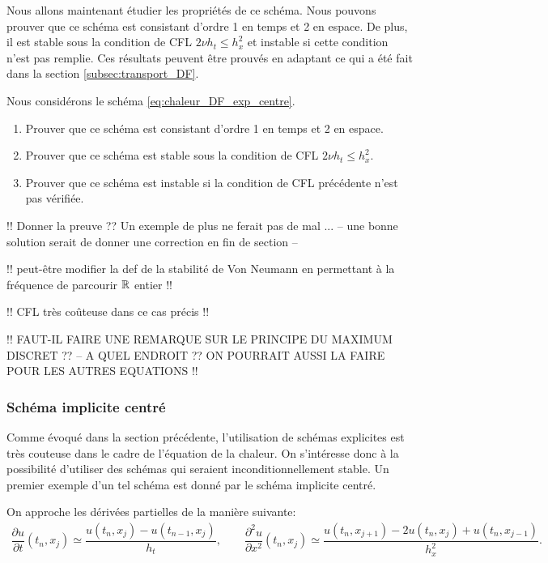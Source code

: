 \documentclass[12pt,a4paper,twoside]{article}
\begin{document}
Nous allons maintenant \'etudier les propri\'et\'es de ce sch\'ema.
Nous pouvons prouver que ce sch\'ema est consistant d'ordre 1 en temps et 2 en espace.
De plus, il est stable sous la condition de CFL $2 \nu h_t \leq h_x^2$ 
et instable si cette condition n'est
pas remplie.
Ces r\'esultats peuvent \^etre prouv\'es en adaptant ce qui a \'et\'e fait dans
la section \ref{subsec:transport_DF}.

\begin{exercise}
  Nous consid\'erons le sch\'ema \eqref{eq:chaleur_DF_exp_centre}.
  \begin{enumerate}
  \item Prouver que ce sch\'ema est consistant d'ordre 1 en temps et 2 en espace.
  \item Prouver que ce sch\'ema est stable sous la condition de CFL
    $2 \nu h_t \leq h_x^2$.
  \item Prouver que ce sch\'ema est instable si la condition de CFL
    pr\'ec\'edente n'est pas v\'erifi\'ee.
  \end{enumerate}
\end{exercise}




!! Donner la preuve ??
Un exemple de plus ne ferait pas de mal ...
-- une bonne solution serait de donner une correction en fin de section --

!! peut-\^etre modifier la def de la stabilit\'e de Von Neumann en permettant
\`a la fr\'equence de parcourir $\mathbb{R}$ entier !!

!! CFL tr\`es co\^uteuse dans ce cas pr\'ecis !!


!! FAUT-IL FAIRE UNE REMARQUE SUR LE PRINCIPE DU MAXIMUM DISCRET ??
-- A QUEL ENDROIT ?? ON POURRAIT AUSSI LA FAIRE POUR LES AUTRES EQUATIONS !!

\subsubsection{Sch\'ema implicite centr\'e}
\label{subsubsec:chaleur_DF_implicite}


Comme \'evoqu\'e dans la section pr\'ec\'edente, l'utilisation de sch\'emas
explicites est tr\`es couteuse dans le cadre de l'\'equation de la chaleur.
On s'int\'eresse donc \`a la possibilit\'e d'utiliser des sch\'emas
qui seraient inconditionnellement stable.
Un premier exemple d'un tel sch\'ema est donn\'e par le sch\'ema 
implicite centr\'e.


On approche les d\'eriv\'ees partielles de la mani\`ere suivante:
\begin{align*}
  \dfrac{\partial u}{\partial t}(t_n,x_j) \simeq \dfrac{u(t_{n},x_j) - u(t_{n-1},x_j)}{h_t} ,
  \qquad 
  \dfrac{\partial^2 u}{\partial x^2}(t_n,x_j) 
  \simeq \dfrac{u(t_{n},x_{j+1}) - 2 u(t_n,x_j) + u(t_n,x_{j-1})}{h_x^2} .
\end{align*}
\end{document}
